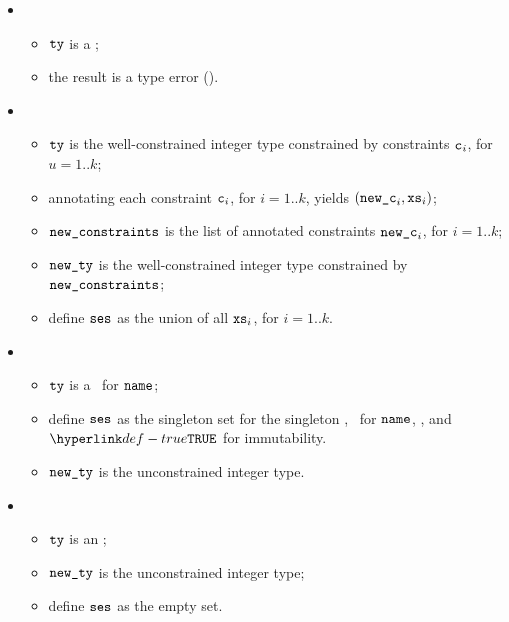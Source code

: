 \ProseParagraph
\OneApplies
\begin{itemize}
  \item {}
    \begin{itemize}
      \item $\texttt{ty}$ is a \pendingconstrainedintegertype;
      \item the result is a type error (\UnexpectedType).
    \end{itemize}
  \item {}
    \begin{itemize}
      \item $\texttt{ty}$ is the well-constrained integer type constrained by
        constraints $\texttt{c}_i$, for $u=1..k$;
      \item annotating each constraint $\texttt{c}_i$, for $i=1..k$,
      yields $(\texttt{new\_c}_i, \texttt{xs}_i)$\ProseOrTypeError;
      \item $\texttt{new\_constraints}$ is the list of annotated constraints $\texttt{new\_c}_i$,
      for $i=1..k$;
      \item $\texttt{new\_ty}$ is the well-constrained integer type constrained
        by $\texttt{new\_constraints}$;
      \item define $\texttt{ses}$ as the union of all $\texttt{xs}_i$, for $i=1..k$.
    \end{itemize}

    \item {}
    \begin{itemize}
      \item $\texttt{ty}$ is a \parameterizedintegertype\ for $\texttt{name}$;
      \item define $\texttt{ses}$ as the singleton set for the singleton \sideeffectdescriptorterm,
            \ReadLocalTerm\ for $\texttt{name}$, \timeframeconstant, and $\True$ for immutability.
      \item $\texttt{new\_ty}$ is the unconstrained integer type.
    \end{itemize}

    \item {}
    \begin{itemize}
      \item $\texttt{ty}$ is an \unconstrainedintegertype;
      \item $\texttt{new\_ty}$ is the unconstrained integer type;
      \item define $\texttt{ses}$ as the empty set.
    \end{itemize}
  \end{itemize}

